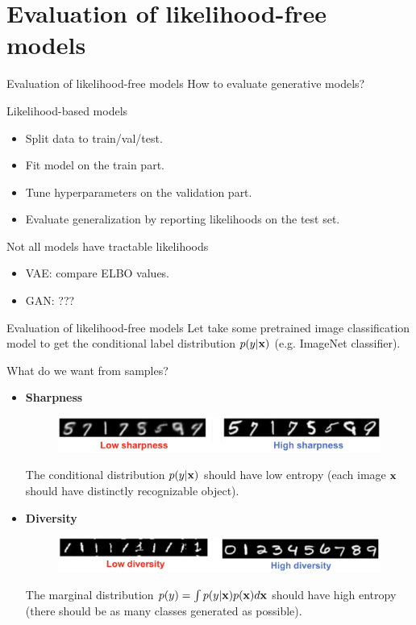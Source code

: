 \section{Evaluation of likelihood-free models}
\begin{frame}{Evaluation of likelihood-free models}
	How to evaluate generative models?
	\begin{block}{Likelihood-based models}
		\begin{itemize}
			\item Split data to train/val/test.
			\item Fit model on the train part.
			\item Tune hyperparameters on the validation part.
			\item Evaluate generalization by reporting likelihoods on the test set.
		\end{itemize}
	\end{block}
	\begin{block}{Not all models have tractable likelihoods}
		\begin{itemize}
			\item VAE: compare ELBO values.
			\item GAN: ???
		\end{itemize}
	\end{block}
\end{frame}
\begin{frame}{Evaluation of likelihood-free models}
	Let take some pretrained image classification model to get the conditional label distribution $p(y | \mathbf{x})$ (e.g. ImageNet classifier).
	\begin{block}{What do we want from samples?}
		\begin{itemize}
			\item \textbf{Sharpness}
			\begin{figure}
				\centering
				\includegraphics[width=0.9\linewidth]{figs/sharpness}
			\end{figure}
			The conditional distribution $p(y | \mathbf{x})$ should have low entropy (each image $\mathbf{x}$ should have distinctly recognizable object).
			\item \textbf{Diversity}
			\begin{figure}
				\centering
				\includegraphics[width=0.9\linewidth]{figs/diversity}
			\end{figure}
			The marginal distribution $p(y) = \int p(y | \mathbf{x}) p(\mathbf{x}) d \mathbf{x}$ should have high entropy (there should be as many classes generated as possible).
		\end{itemize}
	\end{block}
\end{frame}
